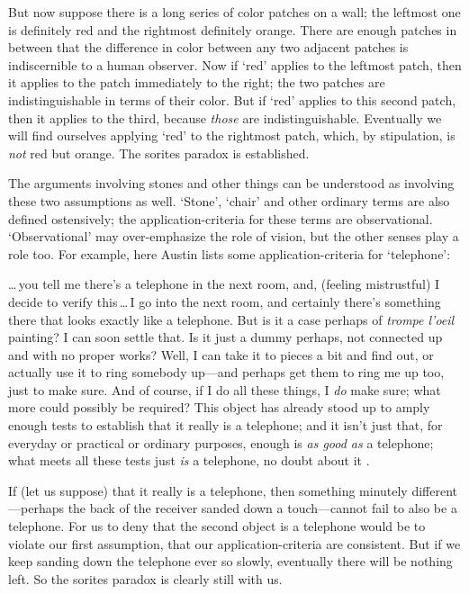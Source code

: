 \documentclass[11pt]{article}
\newenvironment{squote}{%
\begin{spacing}{1}
       	\begin{list}{}{%
\setlength{\labelwidth}{0pt}%
\rightmargin\leftmargin%
}
\item\relax
}{%
\end{list}%
\end{spacing}
}
\begin{document}
\begin{spacing}{1.5}
But now suppose there is a long series of color patches on a wall; the
leftmost one is definitely red and the rightmost definitely orange.
There are enough patches in between that the difference in color
between any two adjacent patches is indiscernible to a human observer.
Now if `red' applies to the leftmost patch, then it applies to the
patch immediately to the right; the two patches are indistinguishable
in terms of their color.  But if `red' applies to this second patch,
then it applies to the third, because \emph{those} are
indistinguishable.  Eventually we will find ourselves applying `red'
to the rightmost patch, which, by stipulation, is \emph{not} red but
orange.  The sorites paradox is established.

The arguments involving stones and other things can be understood as
involving these two assumptions as well.  `Stone', `chair' and other
ordinary terms are also defined ostensively; the application-criteria
for these terms are observational.  `Observational' may over-emphasize
the role of vision, but the other senses play a role too.  For
example, here Austin lists some application-criteria for `telephone':

\begin{squote}
\ldots\,you tell me there's a telephone in the next room, and,
(feeling mistrustful) I decide to verify this\,\ldots\,I go into the
next room, and certainly there's something there that looks exactly
like a telephone.  But is it a case perhaps of \emph{trompe l'oeil}
painting?  I can soon settle that.  Is it just a dummy perhaps, not
connected up and with no proper works?  Well, I can take it to pieces
a bit and find out, or actually use it to ring somebody up---and
perhaps get them to ring me up too, just to make sure.  And of course,
if I do all these things, I \emph{do} make sure; what more could
possibly be required?  This object has already stood up to amply
enough tests to establish that it really is a telephone; and it isn't
just that, for everyday or practical or ordinary purposes, enough is
\emph{as good as} a telephone; what meets all these tests just
\emph{is} a telephone, no doubt about it \citep[115?]{austin1965}.
\end{squote}

If (let us suppose) that it really is a telephone, then something
minutely different---perhaps the back of the receiver sanded down a
touch---cannot fail to also be a telephone.  For us to deny that the
second object is a telephone would be to violate our first assumption,
that our application-criteria are consistent.  But if we keep sanding
down the telephone ever so slowly, eventually there will be nothing
left.  So the sorites paradox is clearly still with us.


\end{spacing}
\end{document}
